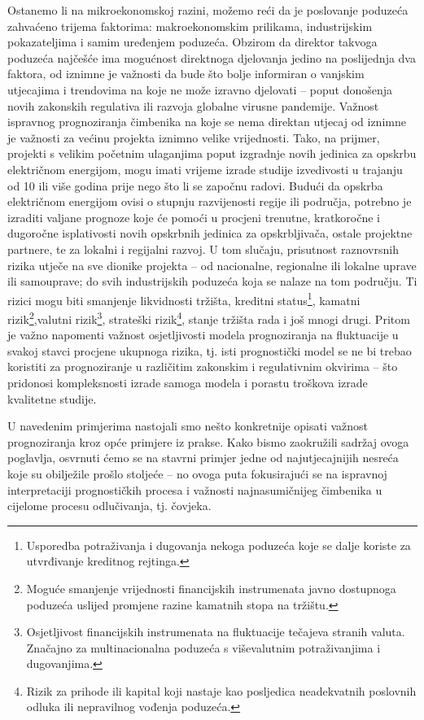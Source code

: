 \documentclass[a4paper,12pt,oneside]{memoir}
\begin{document}
        Ostanemo li na mikroekonomskoj razini, možemo reći da je poslovanje poduzeća zahvaćeno trijema faktorima: makroekonomskim prilikama, industrijskim pokazateljima i samim uređenjem poduzeća. Obzirom da direktor takvoga poduzeća najčešće ima mogućnost direktnoga djelovanja jedino na poslijednja dva faktora, od iznimne je važnosti da bude što bolje informiran o vanjskim utjecajima i trendovima na koje ne može izravno djelovati -- poput donošenja novih zakonskih regulativa ili razvoja globalne virusne pandemije. Važnost ispravnog prognoziranja čimbenika na koje se nema direktan utjecaj od iznimne je važnosti za većinu projekta iznimno velike vrijednosti. Tako, na prijmer, projekti s velikim početnim ulaganjima poput izgradnje novih jedinica za opskrbu električnom energijom, mogu imati vrijeme izrade studije izvedivosti u trajanju od 10 ili više godina prije nego što li se započnu radovi. Budući da opskrba električnom energijom ovisi o stupnju razvijenosti regije ili područja, potrebno je izraditi valjane prognoze koje će pomoći u procjeni trenutne, kratkoročne i dugoročne isplativosti novih opskrbnih jedinica za opskrbljivača, ostale projektne partnere, te za lokalni i regijalni razvoj. U tom slučaju, prisutnost raznovrsnih rizika utječe na sve dionike projekta -- od nacionalne, regionalne ili lokalne uprave ili samouprave; do svih industrijskih poduzeća koja se nalaze na tom području. Ti rizici mogu biti smanjenje likvidnosti tržišta, kreditni status\footnote{Usporedba potraživanja i dugovanja nekoga poduzeća koje se dalje koriste za utvrđivanje kreditnog rejtinga.}, kamatni rizik\footnote{Moguće smanjenje vrijednosti financijskih instrumenata javno dostupnoga poduzeća uslijed promjene razine kamatnih stopa na tržištu.},valutni rizik\footnote{Osjetljivost financijskih instrumenata na fluktuacije tečajeva stranih valuta. Značajno za multinacionalna poduzeća s viševalutnim potraživanjima i dugovanjima.}, strateški rizik\footnote{Rizik za prihode ili kapital koji nastaje kao posljedica neadekvatnih poslovnih odluka ili nepravilnog vođenja poduzeća.}, stanje tržišta rada i još mnogi drugi. Pritom je važno napomenti važnost osjetljivosti modela prognoziranja na fluktuacije u svakoj stavci procjene ukupnoga rizika, tj. isti prognostički model se ne bi trebao koristiti za prognoziranje u različitim zakonskim i regulativnim okvirima -- što pridonosi kompleksnosti izrade samoga modela i porastu troškova izrade kvalitetne studije.


        U navedenim primjerima nastojali smo nešto konkretnije opisati važnost prognoziranja kroz opće primjere iz prakse. Kako bismo zaokružili sadržaj ovoga poglavlja, osvrnuti ćemo se na stavrni primjer jedne od najutjecajnijih nesreća koje su obilježile prošlo stoljeće --  no ovoga puta fokusirajući se na ispravnoj interpretaciji prognostičkih procesa i važnosti najnasumičnijeg čimbenika u cijelome procesu odlučivanja, tj. čovjeka.
\end{document}
